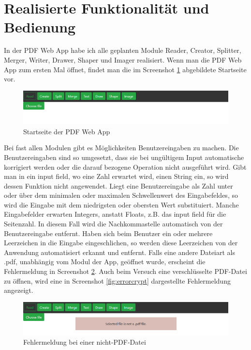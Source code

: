 \section{Realisierte Funktionalität und Bedienung}
In der PDF Web App habe ich alle geplanten Module Reader, Creator, Splitter, Merger, Writer, Drawer, Shaper und Imager realisiert. Wenn man die PDF Web App zum ersten Mal öffnet, findet man die im Screenshot \ref{fig:start} abgebildete Startseite vor.

\begin{figure}[!htbp]
	\centering
	\includegraphics[width=1\textwidth]{"images/startseite.png"}
	\caption{Startseite der PDF Web App}
	\label{fig:start}
\end{figure}

Bei fast allen Modulen gibt es Möglichkeiten Benutzereingaben zu machen. Die Benutzereingaben sind so umgesetzt, dass sie bei ungültigem Input automatische korrigiert werden oder die darauf bezogene Operation nicht ausgeführt wird. Gibt man in ein input field, wo eine Zahl erwartet wird, einen String ein, so wird dessen Funktion nicht angewendet. Liegt eine Benutzereingabe als Zahl unter oder über dem minimalen oder maximalen Schwellenwert des Eingabefeldes, so wird die Eingabe mit dem niedrigsten oder obersten Wert substituiert. Manche Eingabefelder erwarten Integers, anstatt Floats, z.B. das input field für die Seitenzahl. In diesem Fall wird die Nachkommastelle automatisch von der Benutzereingabe entfernt. Haben sich beim Benutzer ein oder mehrere Leerzeichen in die Eingabe eingeschlichen, so werden diese Leerzeichen von der Anwendung automatisiert erkannt und entfernt. Falls eine andere Dateiart als .pdf, unabhängig vom Modul der App, geöffnet wurde, erscheint die Fehlermeldung in Screenshot \ref{fig:errorfile}. Auch beim Versuch eine verschlüsselte PDF-Datei zu öffnen, wird eine in Screenshot \ref{fig:errorcrypt} dargestellte Fehlermeldung angezeigt.

\begin{figure}[!htbp]
	\centering
	\includegraphics[width=1\textwidth]{"images/errorfile.png"}
	\caption{Fehlermeldung bei einer nicht-PDF-Datei}
	\label{fig:errorfile}
\end{figure}


